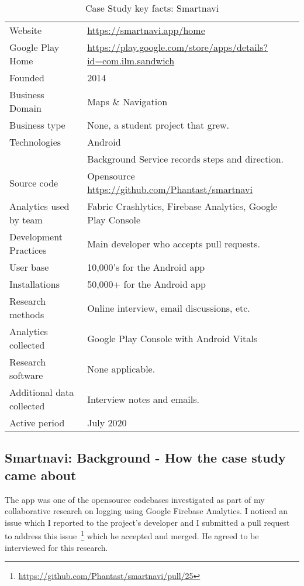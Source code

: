 {\renewcommand{\arraystretch}{0.8}%
\begin{table}[htbp!]
    \centering
    \small
    \setlength{\tabcolsep}{6pt}
    \begin{tabular}{lp{9cm}}
       \toprule
       Website &\url{https://smartnavi.app/home} \\
       Google Play Home & \url{https://play.google.com/store/apps/details?id=com.ilm.sandwich} \\
       Founded & 2014 \\
       Business Domain & Maps \& Navigation \\
       Business type & None, a student project that grew. \\
       Technologies  & Android \\
       & Background Service records steps and direction. \\
       Source code  & Opensource \url{https://github.com/Phantast/smartnavi} \\
       Analytics used by team & Fabric Crashlytics, Firebase Analytics, Google Play Console \\
       Development Practices & Main developer who accepts pull requests. \\
       \midrule
       User base & 10,000's for the Android app \\
       Installations & 50,000+ for the Android app \\
       \midrule
       Research methods &Online interview, email discussions, etc. \\
       Analytics collected &Google Play Console with Android Vitals \\
       Research software & None applicable. \\
       Additional data collected &Interview notes and emails. \\
       Active period & July 2020 \\
       \bottomrule
    \end{tabular}
    \caption{Case Study key facts: Smartnavi}
    \label{tab:smartnavi_anaytics_overview}
\end{table}
}

\subsection{Smartnavi: Background - How the case study came about}
The app was one of the opensource codebases investigated as part of my collaborative research on logging using Google Firebase Analytics. I noticed an issue which I reported to the project's developer and I submitted a pull request to address this issue~\footnote{\url{https://github.com/Phantast/smartnavi/pull/25}} which he accepted and merged. He agreed to be interviewed for this research.


